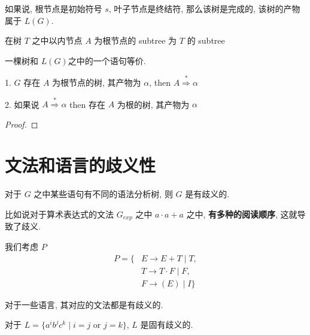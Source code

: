 \documentclass[../main.tex]{subfiles}
\begin{document}
如果说, 根节点是初始符号 \(s\), 叶子节点是终结符, 那么该树是完成的, 该树的产物属于 \(L (G) \). 
\begin{definition}[subtree]\label{def:subtree}
在树 \(T\) 之中以内节点 \(A\) 为根节点的 subtree 为 \(T\) 的 subtree
\end{definition}

\begin{thm}
	一棵树和 \(L (G)\)之中的一个语句等价. 

	1. \(G\) 存在 \(A\) 为根节点的树, 其产物为 \(\alpha\), then \(A \overset{*}{\Rightarrow}\alpha\)

	2. 如果说 \(A \overset{*}{\Rightarrow}\alpha\) then 存在 \(A\) 为根的树, 其产物为 \(\alpha\)
\end{thm}
\begin{proof}
\end{proof}


\section{文法和语言的歧义性}\label{sec:文法和语言的歧义性}

对于 \(G\) 之中某些语句有不同的语法分析树, 则 \(G\) 是有歧义的.

比如说对于算术表达式的文法 \(G_{exp}\) 之中 \(a \cdot a  +  a\) 之中, \textbf{有多种的阅读顺序}, 这就导致了歧义. 

\begin{exam}[表示加法乘法的优先级]
我们考虑 \(P\)
\begin{equation}
\begin{aligned}
	P  = \{  &E \to E + T \mid T ,\\ 
	  &T \to T \cdot F \mid F , \\
	  &F \to (E) \mid I \}
\end{aligned}
\end{equation}
\end{exam}

\begin{definition}[固有歧义]\label{def:固有歧义}
	对于一些语言, 其对应的文法都是有歧义的.
\end{definition}

\begin{exam}
	对于 \(L = \{ a ^{i }  b ^{j} c ^{k} \mid i =  j \text{ or } j = k \} \), \(L\) 是固有歧义的. 
\end{exam}
\end{document}
